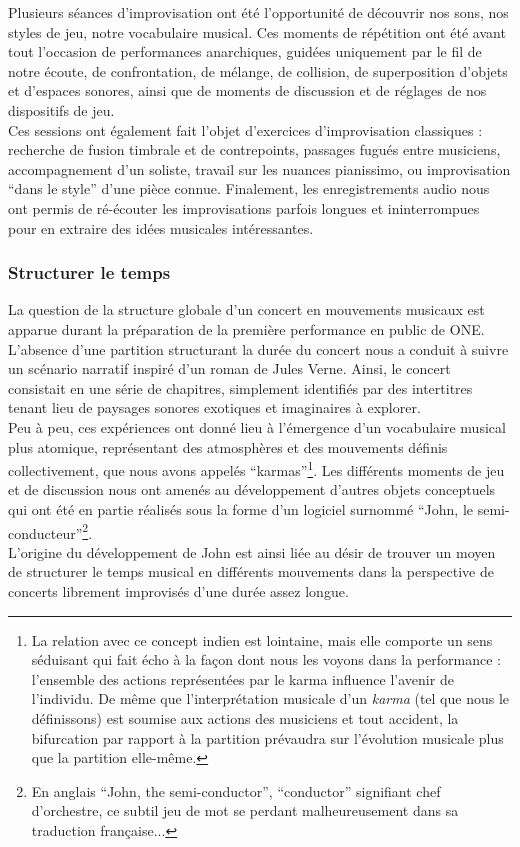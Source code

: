 \noindent Plusieurs séances d'improvisation ont été l'opportunité de découvrir nos sons, nos styles de jeu, notre vocabulaire musical. Ces moments de répétition ont été avant tout l'occasion de performances anarchiques, guidées uniquement par le fil de notre écoute, de confrontation, de mélange, de collision, de superposition d'objets et d'espaces sonores, ainsi que de moments de discussion et de réglages de nos dispositifs de jeu.\\
\indent Ces sessions ont également fait l'objet d'exercices d'improvisation classiques : recherche de fusion timbrale et de contrepoints, passages fugués entre musiciens, accompagnement d'un soliste, travail sur les nuances pianissimo, ou improvisation ``dans le style'' d'une pièce connue. Finalement, les enregistrements audio nous ont permis de ré-écouter les improvisations parfois longues et ininterrompues pour en extraire des idées musicales intéressantes.\\

\subsubsection{Structurer le temps}

\noindent La question de la structure globale d'un concert en mouvements musicaux est apparue durant la préparation de la première performance en public de ONE. L'absence d'une partition structurant la durée du concert nous a conduit à suivre un scénario narratif inspiré d'un roman de Jules Verne. Ainsi, le concert consistait en une série de chapitres, simplement identifiés par des intertitres tenant lieu de paysages sonores exotiques et imaginaires à explorer.\\
\indent Peu à peu, ces expériences ont donné lieu à l'émergence d'un vocabulaire musical plus atomique, représentant des atmosphères et des mouvements définis collectivement, que nous avons appelés ``karmas''\footnote{La relation avec ce concept indien est lointaine, mais elle comporte un sens séduisant qui fait écho à la façon dont nous les voyons dans la performance : l'ensemble des actions représentées par le karma influence l'avenir de l'individu. De même que l'interprétation musicale d'un \textit{karma} (tel que nous le définissons) est soumise aux actions des musiciens et tout accident, la bifurcation par rapport à la partition prévaudra sur l'évolution musicale plus que la partition elle-même.}. Les différents moments de jeu et de discussion nous ont amenés au développement d'autres objets conceptuels qui ont été en partie réalisés sous la forme d'un logiciel surnommé ``John, le semi-conducteur''\footnote{En anglais ``John, the semi-conductor'', ``conductor'' signifiant chef d'orchestre, ce subtil jeu de mot se perdant malheureusement dans sa traduction française...}.\\
\indent L'origine du développement de John est ainsi liée au désir de trouver un moyen de structurer le temps musical en différents mouvements dans la perspective de concerts librement improvisés d'une durée assez longue. 

